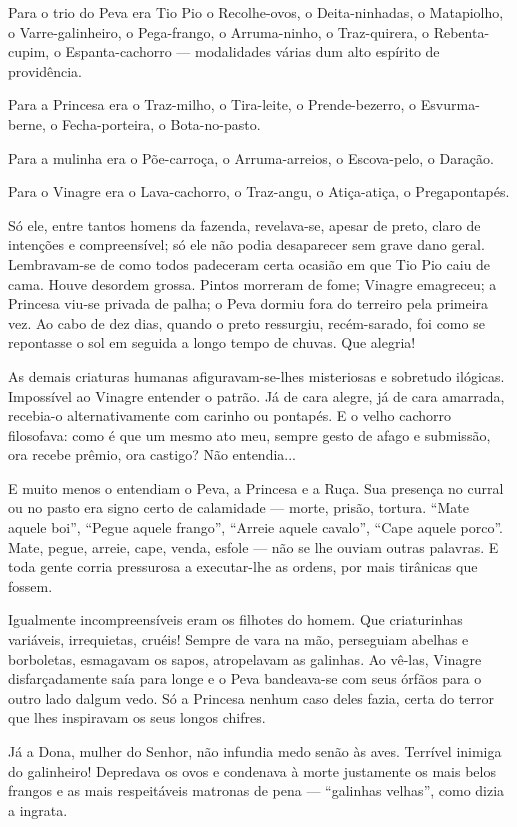 Para o trio do Peva era Tio Pio o Recolhe-ovos, o Deita-ninhadas, o
Matapiolho, o Varre-galinheiro, o Pega-frango, o Arruma-ninho, o
Traz-quirera, o Rebenta-cupim, o Espanta-cachorro --- modalidades várias
dum alto espírito de providência.

Para a Princesa era o Traz-milho, o Tira-leite, o Prende-bezerro, o
Esvurma-berne, o Fecha-porteira, o Bota-no-pasto.

Para a mulinha era o Põe-carroça, o Arruma-arreios, o Escova-pelo, o
Daração.

Para o Vinagre era o Lava-cachorro, o Traz-angu, o Atiça-atiça, o
Pregapontapés.

Só ele, entre tantos homens da fazenda, revelava-se, apesar de preto,
claro de intenções e compreensível; só ele não podia desaparecer sem
grave dano geral. Lembravam-se de como todos padeceram certa ocasião em
que Tio Pio caiu de cama. Houve desordem grossa. Pintos morreram de
fome; Vinagre emagreceu; a Princesa viu-se privada de palha; o Peva
dormiu fora do terreiro pela primeira vez. Ao cabo de dez dias, quando o
preto ressurgiu, recém-sarado, foi como se repontasse o sol em seguida a
longo tempo de chuvas. Que alegria!

As demais criaturas humanas afiguravam-se-lhes misteriosas e sobretudo
ilógicas. Impossível ao Vinagre entender o patrão. Já de cara alegre, já
de cara amarrada, recebia-o alternativamente com carinho ou pontapés. E
o velho cachorro filosofava: como é que um mesmo ato meu, sempre gesto
de afago e submissão, ora recebe prêmio, ora castigo? Não entendia...

E muito menos o entendiam o Peva, a Princesa e a Ruça. Sua presença no
curral ou no pasto era signo certo de calamidade --- morte, prisão,
tortura. ``Mate aquele boi'', ``Pegue aquele frango'', ``Arreie aquele
cavalo'', ``Cape aquele porco''. Mate, pegue, arreie, cape, venda,
esfole --- não se lhe ouviam outras palavras. E toda gente corria
pressurosa a executar-lhe as ordens, por mais tirânicas que fossem.

Igualmente incompreensíveis eram os filhotes do homem. Que criaturinhas
variáveis, irrequietas, cruéis! Sempre de vara na mão, perseguiam
abelhas e borboletas, esmagavam os sapos, atropelavam as galinhas. Ao
vê-las, Vinagre disfarçadamente saía para longe e o Peva bandeava-se com
seus órfãos para o outro lado dalgum vedo. Só a Princesa nenhum caso
deles fazia, certa do terror que lhes inspiravam os seus longos chifres.

Já a Dona, mulher do Senhor, não infundia medo senão às aves. Terrível
inimiga do galinheiro! Depredava os ovos e condenava à morte justamente
os mais belos frangos e as mais respeitáveis matronas de pena ---
``galinhas velhas'', como dizia a ingrata.


